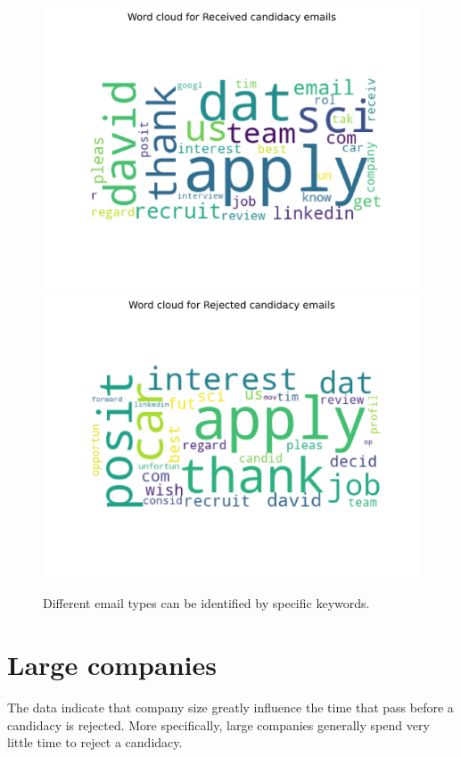 \documentclass[12pt]{article}
\begin{document}
\begin{figure}
    \center
	\includegraphics[width = \linewidth]{wordcloud_Received.png}
	\includegraphics[width = \linewidth]{wordcloud_Rejected.png}
	\caption{Different email types can be identified by specific keywords.  \label{fig:email_keywords}}
\end{figure}

\section{Large companies }
The data indicate that company size greatly influence the time that pass before a candidacy is rejected. More specifically, large companies generally spend very little time to reject a candidacy.
\end{document}
